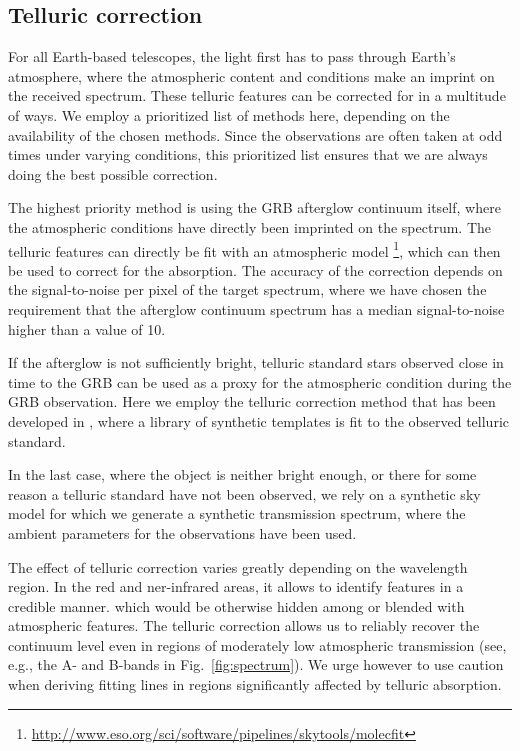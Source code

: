 \documentclass[longauth]{aa}    %
\begin{document}
\subsection{Telluric correction} \label{tell_corr}

For all Earth-based telescopes, the light first has to pass through Earth's
atmosphere, where the atmospheric content and conditions make an imprint on the
received spectrum. These telluric features can be corrected for in a multitude
of ways. We employ a prioritized list of methods here, depending on the
availability of the chosen methods. Since the observations are often taken at
odd times under varying conditions, this prioritized list ensures that we are
always doing the best possible correction.

The highest priority method is using the GRB afterglow continuum itself, where
the atmospheric conditions have directly been imprinted on the spectrum. The
telluric features can directly be fit with an atmospheric model \citep[\texttt{Molecfit};][]{Smette2015,
	Kausch2015}\footnote{\url{http://www.eso.org/sci/software/pipelines/skytools/molecfit}}, which can then be used to correct for the absorption. The accuracy of the correction depends on the signal-to-noise per pixel of the target spectrum, where we have chosen the requirement that the afterglow continuum spectrum has a median signal-to-noise higher than a value of 10.

If the afterglow is not sufficiently bright, telluric standard stars observed
close in time to the GRB can be used as a proxy for the atmospheric
condition during the GRB observation. Here we employ the telluric correction
method that has been developed in \citet{Selsing2015}, where a library of
synthetic templates is fit to the observed telluric standard.

In the last case, where the object is neither bright enough, or there for some
reason a telluric standard have not been observed, we rely on a synthetic sky
model \citep{Noll2012, Jones2013} for which we generate a
synthetic transmission spectrum, where the ambient parameters for the
observations have been used.

The effect of telluric correction varies greatly depending on the wavelength
region. In the red and ner-infrared areas, it allows to identify features in a
credible manner. which would be otherwise hidden among or blended with
atmospheric features. The telluric correction allows us to reliably recover the
continuum level even in regions of moderately low atmospheric transmission (see,
e.g., the A- and B-bands in Fig.~\ref{fig:spectrum}). We urge however to use
caution when deriving fitting lines in regions significantly affected by
telluric absorption.
\end{document}
